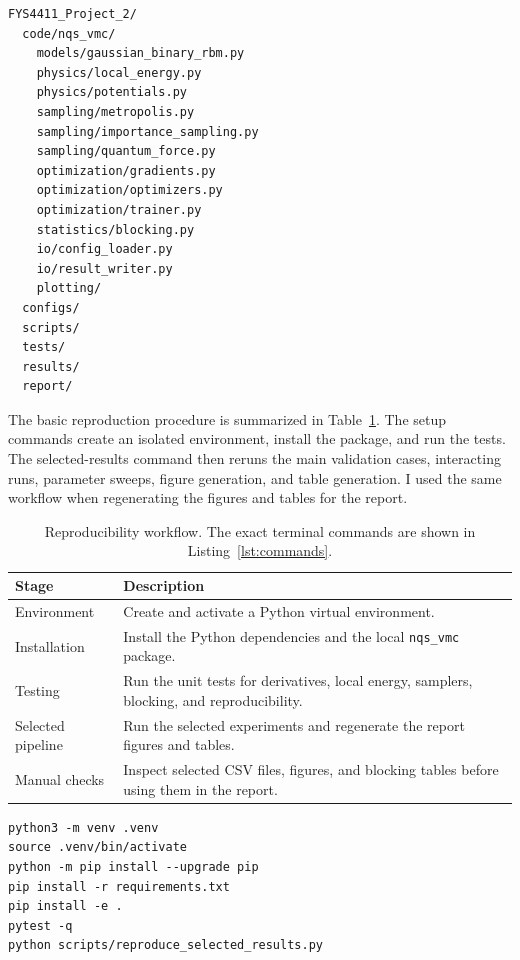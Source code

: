 \documentclass[10pt,a4paper]{article}
\newcommand{\code}[1]{\texttt{#1}}
\begin{document}
\begin{lstlisting}[caption={Simplified repository tree.},label={lst:tree},basicstyle=\ttfamily\small]
FYS4411_Project_2/
  code/nqs_vmc/
    models/gaussian_binary_rbm.py
    physics/local_energy.py
    physics/potentials.py
    sampling/metropolis.py
    sampling/importance_sampling.py
    sampling/quantum_force.py
    optimization/gradients.py
    optimization/optimizers.py
    optimization/trainer.py
    statistics/blocking.py
    io/config_loader.py
    io/result_writer.py
    plotting/
  configs/
  scripts/
  tests/
  results/
  report/
\end{lstlisting}

The basic reproduction procedure is summarized in Table~\ref{tab:repro-workflow}.  The setup commands create an isolated environment, install the package, and run the tests.  The selected-results command then reruns the main validation cases, interacting runs, parameter sweeps, figure generation, and table generation.  I used the same workflow when regenerating the figures and tables for the report.

\begin{table}[H]
\centering
\caption{Reproducibility workflow.  The exact terminal commands are shown in Listing~\ref{lst:commands}.}
\label{tab:repro-workflow}
\begin{tabularx}{\columnwidth}{@{}>{\raggedright\arraybackslash}p{}X@{}}
\toprule
Stage & Description \\
\midrule
Environment & Create and activate a Python virtual environment. \\
Installation & Install the Python dependencies and the local \code{nqs\_vmc} package. \\
Testing & Run the unit tests for derivatives, local energy, samplers, blocking, and reproducibility. \\
Selected pipeline & Run the selected experiments and regenerate the report figures and tables. \\
Manual checks & Inspect selected CSV files, figures, and blocking tables before using them in the report. \\
\bottomrule
\end{tabularx}
\end{table}

\begin{lstlisting}[caption={Main setup and reproduction commands.},label={lst:commands},basicstyle=\ttfamily\small]
python3 -m venv .venv
source .venv/bin/activate
python -m pip install --upgrade pip
pip install -r requirements.txt
pip install -e .
pytest -q
python scripts/reproduce_selected_results.py
\end{lstlisting}
\end{document}
